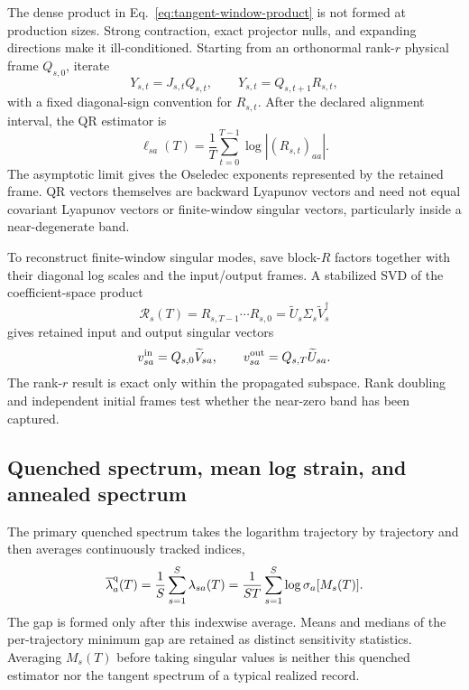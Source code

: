 \documentclass[aps,prx,twocolumn,floatfix,nofootinbib,superscriptaddress,longbibliography]{revtex4-2}
\begin{document}
The dense product in Eq.~\eqref{eq:tangent-window-product} is not formed at production
sizes.  Strong contraction, exact projector nulls, and expanding directions make it
ill-conditioned.  Starting from an orthonormal rank-$r$ physical frame $Q_{s,0}$, iterate
\begin{equation}
 Y_{s,t}=J_{s,t}Q_{s,t},
 \qquad
 Y_{s,t}=Q_{s,t+1}R_{s,t},
 \label{eq:tangent-qr-step}
\end{equation}
with a fixed diagonal-sign convention for $R_{s,t}$.  After the declared alignment
interval, the QR estimator is
\begin{equation}
 \ell_{sa}(T)
 =\frac1T\sum_{t=0}^{T-1}\log |(R_{s,t})_{aa}|.
 \label{eq:qr-lyapunov-estimator}
\end{equation}
The asymptotic limit gives the Oseledec exponents represented by the retained frame.  QR
vectors themselves are backward Lyapunov vectors and need not equal covariant Lyapunov
vectors or finite-window singular vectors, particularly inside a near-degenerate band.

To reconstruct finite-window singular modes, save block-$R$ factors together with their
diagonal log scales and the input/output frames.  A stabilized SVD of the coefficient-space
product
\begin{equation}
 \mathcal R_s(T)=R_{s,T-1}\cdots R_{s,0}
 =\widetilde U_s\Sigma_s\widetilde V_s^\dagger
 \label{eq:stabilized-r-product}
\end{equation}
gives retained input and output singular vectors
\begin{equation}
 v_{sa}^{\rm in}=Q_{s,0}\widetilde V_{sa},
 \qquad
 v_{sa}^{\rm out}=Q_{s,T}\widetilde U_{sa}.
 \label{eq:retained-singular-vectors}
\end{equation}
The rank-$r$ result is exact only within the propagated subspace.  Rank doubling and
independent initial frames test whether the near-zero band has been captured.

\subsection{Quenched spectrum, mean log strain, and annealed spectrum}

The primary quenched spectrum takes the logarithm trajectory by trajectory and then
averages continuously tracked indices,
\begin{equation}
 \overline\lambda_a^{\rm q}(T)
 =\frac1S\sum_{s=1}^S\lambda_{sa}(T)
 =\frac1{ST}\sum_{s=1}^S\log\sigma_a[M_s(T)].
 \label{eq:quenched-lyapunov-spectrum}
\end{equation}
The gap is formed only after this indexwise average.  Means and medians of the
per-trajectory minimum gap are retained as distinct sensitivity statistics.  Averaging
$M_s(T)$ before taking singular values is neither this quenched estimator nor the tangent
spectrum of a typical realized record.
\end{document}
